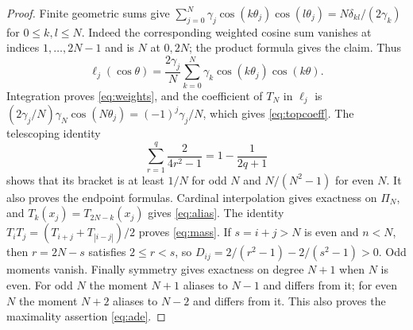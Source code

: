 \documentclass{siamart251216}
\newcommand{\Pn}{\Pi}
\begin{document}
\begin{proof}
Finite geometric sums give
$\sum_{j=0}^N\gamma_j\cos(k\theta_j)\cos(l\theta_j)
=N\delta_{kl}/(2\gamma_k)$ for $0\le k,l\le N$.
Indeed the corresponding weighted cosine sum vanishes at indices
$1,\ldots,2N-1$ and is $N$ at $0,2N$; the product formula gives the claim.
Thus
\[
 \ell_j(\cos\theta)=\frac{2\gamma_j}{N}
       \sum_{k=0}^N\gamma_k\cos(k\theta_j)\cos(k\theta).
\]
Integration proves \eqref{eq:weights}, and the coefficient of $T_N$ in
$\ell_j$ is $(2\gamma_j/N)\gamma_N\cos(N\theta_j)=(-1)^j\gamma_j/N$, which
gives \eqref{eq:topcoeff}. The telescoping identity
\begin{equation}\label{eq:telescope}
 \sum_{r=1}^q\frac2{4r^2-1}=1-\frac1{2q+1}
\end{equation}
shows that its bracket is at least $1/N$ for odd $N$ and
$N/(N^2-1)$ for even $N$. It also proves the endpoint formulas.
Cardinal interpolation gives exactness on $\Pn_N$, and
$T_k(x_j)=T_{2N-k}(x_j)$ gives \eqref{eq:alias}.
The identity $T_iT_j=(T_{i+j}+T_{|i-j|})/2$ proves \eqref{eq:mass}.
If $s=i+j>N$ is even and $n<N$, then $r=2N-s$ satisfies $2\le r<s$,
so $D_{ij}=2/(r^2-1)-2/(s^2-1)>0$. Odd moments vanish.
Finally symmetry gives exactness on degree $N+1$ when $N$ is even.
For odd $N$ the moment $N+1$ aliases to $N-1$ and differs from it;
for even $N$ the moment $N+2$ aliases to $N-2$ and differs from it.
This also proves the maximality assertion \eqref{eq:ade}.
\end{proof}
\end{document}
